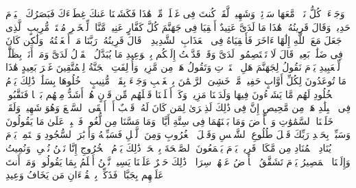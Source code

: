 \startbuffer[\q:50:21]
وَجَاۤءَتۡ كُلُّ نَفۡسࣲ مَّعَهَا سَاۤئِقࣱ وَشَهِیدࣱ%
\stopbuffer%
\startbuffer[\q:50:22]
لَّقَدۡ كُنتَ فِی غَفۡلَةࣲ مِّنۡ هَٰذَا فَكَشَفۡنَا عَنكَ غِطَاۤءَكَ فَبَصَرُكَ ٱلۡیَوۡمَ حَدِیدࣱ%
\stopbuffer%
\startbuffer[\q:50:23]
وَقَالَ قَرِینُهُۥ هَٰذَا مَا لَدَیَّ عَتِیدٌ%
\stopbuffer%
\startbuffer[\q:50:24]
أَلۡقِیَا فِی جَهَنَّمَ كُلَّ كَفَّارٍ عَنِیدࣲ%
\stopbuffer%
\startbuffer[\q:50:25]
مَّنَّاعࣲ لِّلۡخَیۡرِ مُعۡتَدࣲ مُّرِیبٍ%
\stopbuffer%
\startbuffer[\q:50:26]
ٱلَّذِی جَعَلَ مَعَ ٱللَّهِ إِلَٰهًا ءَاخَرَ فَأَلۡقِیَاهُ فِی ٱلۡعَذَابِ ٱلشَّدِیدِ%
\stopbuffer%
\startbuffer[\q:50:27]
۞ قَالَ قَرِینُهُۥ رَبَّنَا مَاۤ أَطۡغَیۡتُهُۥ وَلَٰكِن كَانَ فِی ضَلَٰلِۭ بَعِیدࣲ%
\stopbuffer%
\startbuffer[\q:50:28]
قَالَ لَا تَخۡتَصِمُوا۟ لَدَیَّ وَقَدۡ قَدَّمۡتُ إِلَیۡكُم بِٱلۡوَعِیدِ%
\stopbuffer%
\startbuffer[\q:50:29]
مَا یُبَدَّلُ ٱلۡقَوۡلُ لَدَیَّ وَمَاۤ أَنَا۠ بِظَلَّٰمࣲ لِّلۡعَبِیدِ%
\stopbuffer%
\startbuffer[\q:50:30]
یَوۡمَ نَقُولُ لِجَهَنَّمَ هَلِ ٱمۡتَلَأۡتِ وَتَقُولُ هَلۡ مِن مَّزِیدࣲ%
\stopbuffer%
\startbuffer[\q:50:31]
وَأُزۡلِفَتِ ٱلۡجَنَّةُ لِلۡمُتَّقِینَ غَیۡرَ بَعِیدٍ%
\stopbuffer%
\startbuffer[\q:50:32]
هَٰذَا مَا تُوعَدُونَ لِكُلِّ أَوَّابٍ حَفِیظࣲ%
\stopbuffer%
\startbuffer[\q:50:33]
مَّنۡ خَشِیَ ٱلرَّحۡمَٰنَ بِٱلۡغَیۡبِ وَجَاۤءَ بِقَلۡبࣲ مُّنِیبٍ%
\stopbuffer%
\startbuffer[\q:50:34]
ٱدۡخُلُوهَا بِسَلَٰمࣲۖ ذَٰلِكَ یَوۡمُ ٱلۡخُلُودِ%
\stopbuffer%
\startbuffer[\q:50:35]
لَهُم مَّا یَشَاۤءُونَ فِیهَا وَلَدَیۡنَا مَزِیدࣱ%
\stopbuffer%
\startbuffer[\q:50:36]
وَكَمۡ أَهۡلَكۡنَا قَبۡلَهُم مِّن قَرۡنٍ هُمۡ أَشَدُّ مِنۡهُم بَطۡشࣰا فَنَقَّبُوا۟ فِی ٱلۡبِلَٰدِ هَلۡ مِن مَّحِیصٍ%
\stopbuffer%
\startbuffer[\q:50:37]
إِنَّ فِی ذَٰلِكَ لَذِكۡرَىٰ لِمَن كَانَ لَهُۥ قَلۡبٌ أَوۡ أَلۡقَى ٱلسَّمۡعَ وَهُوَ شَهِیدࣱ%
\stopbuffer%
\startbuffer[\q:50:38]
وَلَقَدۡ خَلَقۡنَا ٱلسَّمَٰوَٰتِ وَٱلۡأَرۡضَ وَمَا بَیۡنَهُمَا فِی سِتَّةِ أَیَّامࣲ وَمَا مَسَّنَا مِن لُّغُوبࣲ%
\stopbuffer%
\startbuffer[\q:50:39]
فَٱصۡبِرۡ عَلَىٰ مَا یَقُولُونَ وَسَبِّحۡ بِحَمۡدِ رَبِّكَ قَبۡلَ طُلُوعِ ٱلشَّمۡسِ وَقَبۡلَ ٱلۡغُرُوبِ%
\stopbuffer%
\startbuffer[\q:50:40]
وَمِنَ ٱلَّیۡلِ فَسَبِّحۡهُ وَأَدۡبَٰرَ ٱلسُّجُودِ%
\stopbuffer%
\startbuffer[\q:50:41]
وَٱسۡتَمِعۡ یَوۡمَ یُنَادِ ٱلۡمُنَادِ مِن مَّكَانࣲ قَرِیبࣲ%
\stopbuffer%
\startbuffer[\q:50:42]
یَوۡمَ یَسۡمَعُونَ ٱلصَّیۡحَةَ بِٱلۡحَقِّۚ ذَٰلِكَ یَوۡمُ ٱلۡخُرُوجِ%
\stopbuffer%
\startbuffer[\q:50:43]
إِنَّا نَحۡنُ نُحۡیِۦ وَنُمِیتُ وَإِلَیۡنَا ٱلۡمَصِیرُ%
\stopbuffer%
\startbuffer[\q:50:44]
یَوۡمَ تَشَقَّقُ ٱلۡأَرۡضُ عَنۡهُمۡ سِرَاعࣰاۚ ذَٰلِكَ حَشۡرٌ عَلَیۡنَا یَسِیرࣱ%
\stopbuffer%
\startbuffer[\q:50:45]
نَّحۡنُ أَعۡلَمُ بِمَا یَقُولُونَۖ وَمَاۤ أَنتَ عَلَیۡهِم بِجَبَّارࣲۖ فَذَكِّرۡ بِٱلۡقُرۡءَانِ مَن یَخَافُ وَعِیدِ%
